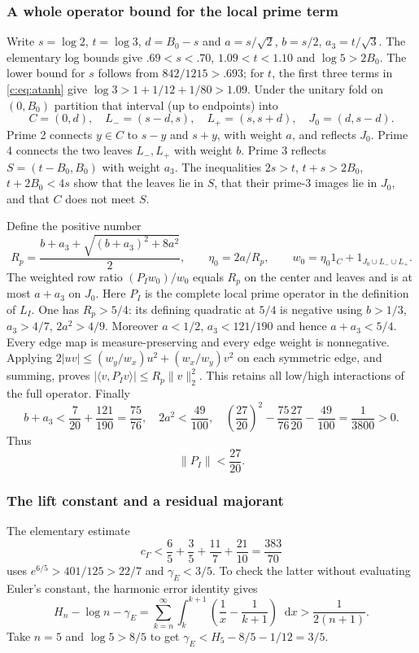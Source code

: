 \documentclass[11pt,a4paper]{article}
\numberwithin{equation}{section}
\theoremstyle{definition}\newtheorem{definition}[theorem]{Definition}
\theoremstyle{remark}\newtheorem{remark}[theorem]{Remark}
\newcommand{\ip}[2]{\langle#1,#2\rangle}\newcommand{\norm}[1]{\lVert#1\rVert}\newcommand{\abs}[1]{\lvert#1\rvert}
\newcommand{\dd}{\mathop{}\!\mathrm d}\newcommand{\one}{\mathbf1}
\newcommand{\PP}{P}\newcommand{\J}{J}\newcommand{\V}{V}\newcommand{\wo}{\mathcal W}
\begin{document}
\subsubsection{A whole operator bound for the local prime term}
Write $s=\log2$, $t=\log3$, $d={B_0}-s$ and
$a=s/\sqrt2$, $b=s/2$, $a_3=t/\sqrt3$.
The elementary log bounds give $.69<s<.70$, $1.09<t<1.10$ and
$\log5>2{B_0}$. The lower bound for $s$ follows from $842/1215>.693$;
for $t$, the first three terms in \eqref{c:eq:atanh} give
$\log3>1+1/12+1/80>1.09$.
Under the unitary fold on $(0,{B_0})$ partition that interval
(up to endpoints) into
\[
 C=(0,d),\quad L_-=(s-d,s),\quad L_+=(s,s+d),\quad
 J_0=(d,s-d).
\]
Prime 2 connects $y\in C$ to $s-y$ and $s+y$, with weight $a$,
and reflects $J_0$. Prime 4 connects the two leaves $L_-,L_+$
with weight $b$. Prime 3 reflects $S=(t-{B_0},{B_0})$ with weight $a_3$.
The inequalities
$2s>t$, $t+s>2{B_0}$, $t+2{B_0}<4s$ show that the leaves lie in $S$,
that their prime-3 images lie in $J_0$, and that $C$ does not meet $S$.

Define the positive number
\[
 R_p=\frac{b+a_3+\sqrt{(b+a_3)^2+8a^2}}2,
 \qquad\eta_0=2a/R_p,
 \qquad w_0=\eta_0 1_C+1_{J_0\cup L_-\cup L_+}.
\]
The weighted row ratio $(\PP_Iw_0)/w_0$ equals $R_p$ on the center
and leaves and is at most $a+a_3$ on $J_0$. Here
$\PP_I$ is the complete local prime operator in the definition of $L_I$.
One has $R_p>5/4$: its defining quadratic at $5/4$ is negative using
$b>1/3$, $a_3>4/7$, $2a^2>4/9$.
Moreover $a<1/2$, $a_3<121/190$ and hence $a+a_3<5/4$.
Every edge map is measure-preserving and every edge weight is
nonnegative. Applying
$2\abs{uv}\le(w_y/w_x)u^2+(w_x/w_y)v^2$ on each symmetric edge,
and summing, proves
$\abs{\ip v{\PP_Iv}}\le R_p\norm v_2^2$.
This retains all low/high interactions of the full operator.
Finally
\[
 b+a_3<\frac7{20}+\frac{121}{190}=\frac{75}{76},\quad
 2a^2<\frac{49}{100},\quad
 \left(\frac{27}{20}\right)^2-\frac{75}{76}\frac{27}{20}
 -\frac{49}{100}=\frac1{3800}>0.
\]
Thus
\begin{equation}\label{c:eq:primeop}
 \norm{\PP_I}<\frac{27}{20}.
\end{equation}

\subsubsection{The lift constant and a residual majorant}
The elementary estimate
\begin{equation}\label{c:eq:cgamma}
 c_\Gamma<\frac65+\frac35+\frac{11}{7}+\frac{21}{10}
 =\frac{383}{70}
\end{equation}
uses $e^{6/5}>401/125>22/7$ and $\gamma_E<3/5$.
To check the latter without evaluating Euler's constant, the harmonic
error identity gives
\[
 H_n-\log n-\gamma_E
 =\sum_{k=n}^\infty\int_k^{k+1}
       \left(\frac1x-\frac1{k+1}\right)\dd x
 >\frac1{2(n+1)}.
\]
Take $n=5$ and $\log5>8/5$ to get
$\gamma_E<H_5-8/5-1/12=3/5$.
\end{document}
